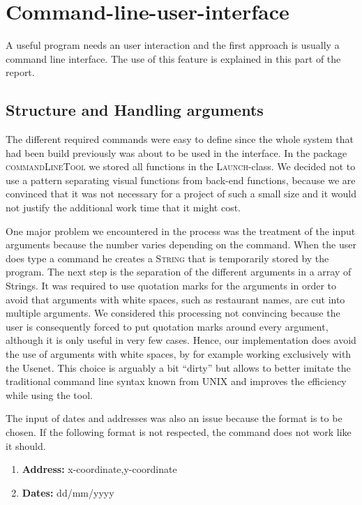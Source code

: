 \section{Command-line-user-interface}
\label{sec:command_line_user_interface}

A useful program needs an user interaction and the first approach is usually a command line 
interface. The use of this feature is explained in this part of the report.

\subsection{Structure and Handling arguments}
\label{sub:structure_and_handling_arguments}

The different required commands were easy to define since the whole system that had been build 
previously was about to be used in the interface. In the package \textsc{commandLineTool} we 
stored all functions in the \textsc{Launch}-class. We decided not to use a pattern separating
visual functions from back-end functions, because we are convinced that it was not necessary for a
project of such a small size and it would not justify the additional work time that it might 
cost.

One major problem we encountered in the process was the treatment of the input arguments because 
the number varies depending on the command. When the user does type a command he creates a 
\textsc{String} that is temporarily stored by the program. The next step is the separation of 
the different arguments in a array of Strings. It was required to use quotation marks for the 
arguments in order to avoid that arguments with white spaces, such as restaurant names,  are cut
into multiple arguments.
We considered this processing not convincing because the user is consequently forced to put 
quotation marks around every argument, although it is only useful in very few cases. Hence, 
our implementation does avoid the use of arguments with white spaces, by for example working 
exclusively with the Usenet. This choice is arguably a bit ``dirty'' but allows to better 
imitate the traditional command line syntax known from \textsc{UNIX} and improves the efficiency 
while using the tool.

The input of dates and addresses was also an issue because the format is to be chosen. If the 
following format is not respected, the command does not work like it should.
\begin{enumerate}
	\item \textbf{Address: } x-coordinate,y-coordinate
	\item \textbf{Dates: } dd/mm/yyyy
\end{enumerate}

